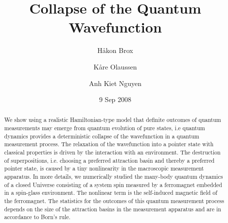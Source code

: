 \documentclass[showpacs,preprintnumbers,amsmath,amssymb,12pt]{revtex4-2}
\begin{document}

\title{Collapse of the Quantum Wavefunction}

\author{H\r{a}kon Brox}%

\author{K\r{a}re Olaussen}%

\author{Anh Kiet Nguyen}%

\date{9 Sep 2008}%

\begin{abstract}
  We show using a realistic Hamiltonian-type model that definite
  outcomes of quantum measurements may emerge from quantum evolution
  of pure states, i.e quantum dynamics provides a deterministic
  collapse of the wavefunction in a quantum measurement process. The
  relaxation of the wavefunction into a pointer state with classical
  properties is driven by the interaction with an environment. The
  destruction of superpositions, i.e. choosing a preferred attraction
  basin and thereby a preferred pointer state, is caused by a tiny
  nonlinearity in the macroscopic measurement apparatus. In more
  details, we numerically studied the many-body quantum dynamics of a
  closed Universe consisting of a system spin measured by a
  ferromagnet embedded in a spin-glass environment. The nonlinear term
  is the self-induced magnetic field of the ferromagnet. The
  statistics for the outcomes of this quantum measurement process
  depends on the size of the attraction basins in the measurement
  apparatus and are in accordance to Born's rule.
\end{abstract}


\maketitle
\end{document}
